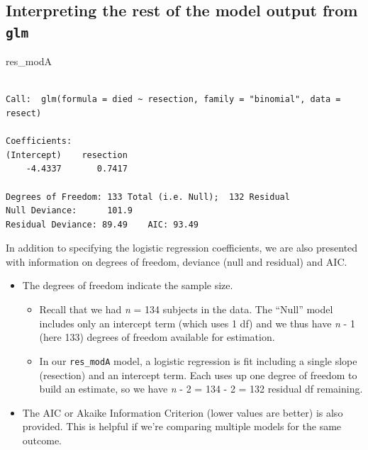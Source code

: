 \documentclass[]{book}
\newenvironment{Shaded}{\begin{snugshade}}{\end{snugshade}}
\newcommand{\NormalTok}[1]{#1}
\providecommand{\tightlist}{%
  \setlength{\itemsep}{0pt}\setlength{\parskip}{0pt}}
\theoremstyle{definition}
\theoremstyle{definition}
\theoremstyle{definition}
\theoremstyle{remark}
\begin{document}
\subsection{\texorpdfstring{Interpreting the rest of the model output
from
\texttt{glm}}{Interpreting the rest of the model output from glm}}\label{interpreting-the-rest-of-the-model-output-from-glm}

\begin{Shaded}
\begin{Highlighting}[]
\NormalTok{res_modA}
\end{Highlighting}
\end{Shaded}

\begin{verbatim}

Call:  glm(formula = died ~ resection, family = "binomial", data = resect)

Coefficients:
(Intercept)    resection  
    -4.4337       0.7417  

Degrees of Freedom: 133 Total (i.e. Null);  132 Residual
Null Deviance:      101.9 
Residual Deviance: 89.49    AIC: 93.49
\end{verbatim}

In addition to specifying the logistic regression coefficients, we are
also presented with information on degrees of freedom, deviance (null
and residual) and AIC.

\begin{itemize}
\tightlist
\item
  The degrees of freedom indicate the sample size.

  \begin{itemize}
  \tightlist
  \item
    Recall that we had \emph{n} = 134 subjects in the data. The ``Null''
    model includes only an intercept term (which uses 1 df) and we thus
    have \emph{n} - 1 (here 133) degrees of freedom available for
    estimation.
  \item
    In our \texttt{res\_modA} model, a logistic regression is fit
    including a single slope (resection) and an intercept term. Each
    uses up one degree of freedom to build an estimate, so we have
    \emph{n} - 2 = 134 - 2 = 132 residual df remaining.
  \end{itemize}
\item
  The AIC or Akaike Information Criterion (lower values are better) is
  also provided. This is helpful if we're comparing multiple models for
  the same outcome.
\end{itemize}
\end{document}
